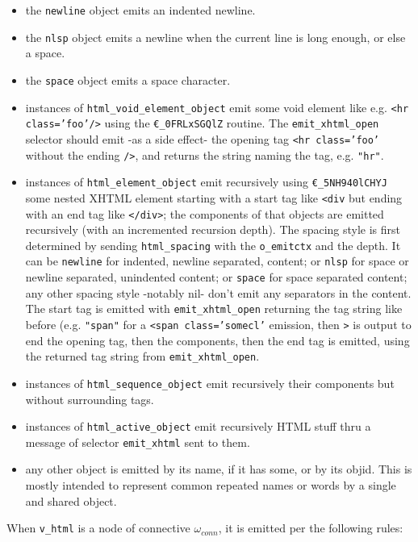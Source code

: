 \begin{itemize}
\item the \texttt{newline} object emits an indented newline.
\item the \texttt{nlsp} object emits a newline when the current line is long enough, or else a space.
\item the \texttt{space} object emits a space character.
\item instances of \texttt{html\_void\_element\_object} emit some void
  element like e.g. \texttt{<hr class='foo'/>} using the
  \texttt{€\_0FRLxSGQlZ} routine. The \texttt{emit\_xhtml\_open}
  selector should emit -as a side effect- the opening tag \texttt{<hr
    class='foo'} without the ending \texttt{/>}, and returns the string naming the tag, e.g. \texttt{"hr"}. 
\item instances of \texttt{html\_element\_object} emit recursively
  using \texttt{€\_5NH940lCHYJ} some nested XHTML element starting
  with a start tag like \texttt{<div} but ending with an end tag like
  \texttt{</div>}; the components of that objects are emitted
  recursively (with an incremented recursion depth). The spacing style
  is first determined by sending \texttt{html\_spacing} with the
  \texttt{o\_emitctx} and the depth. It can be \texttt{newline} for
  indented, newline separated, content; or \texttt{nlsp} for space or
  newline separated, unindented content; or \texttt{space} for space
  separated content; any other spacing style -notably nil- don't emit
  any separators in the content. The start tag is emitted with
  \texttt{emit\_xhtml\_open} returning the tag string like before
  (e.g. \texttt{"span"} for a \texttt{<span class='somecl'} emission,
  then \texttt{>} is output to end the opening tag, then the
  components, then the end tag is emitted, using the returned tag
  string from \texttt{emit\_xhtml\_open}.
\item instances of \texttt{html\_sequence\_object} emit
      recursively their components but without surrounding tags.
\item instances of \texttt{html\_active\_object} emit recursively HTML
  stuff thru a message of selector \texttt{emit\_xhtml} sent to them.
\item any other object is emitted by its name, if it has some, or by
  its objid. This is mostly intended to represent common repeated names or
  words by a single and shared object.
\end{itemize}

When  \texttt{v\_html} is a node of connective $\omega_{conn}$, it is emitted per the following rules:

